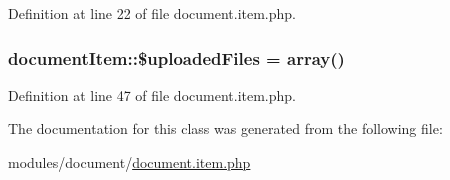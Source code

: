 Definition at line 22 of file document.\+item.\+php.

\hypertarget{classdocumentItem_a70d4321ea0edfb6c1fb0775ced8a6b41}{}
\subsubsection[{\$uploaded\+Files}]{\setlength{\rightskip}{0pt plus 5cm}document\+Item\+::\$uploaded\+Files = array()}\label{classdocumentItem_a70d4321ea0edfb6c1fb0775ced8a6b41}


Definition at line 47 of file document.\+item.\+php.



The documentation for this class was generated from the following file\+:\begin{DoxyCompactItemize}
\item 
modules/document/\hyperlink{document_8item_8php}{document.\+item.\+php}\end{DoxyCompactItemize}
